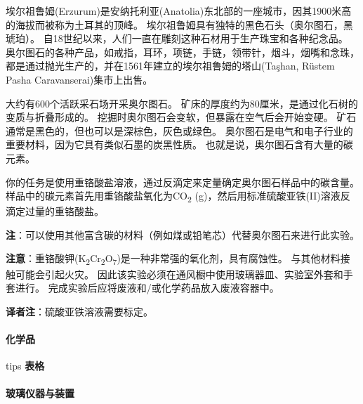 埃尔祖鲁姆(Erzurum)是安纳托利亚(Anatolia)东北部的一座城市，因其1900米高的海拔而被称为土耳其的顶峰。
埃尔祖鲁姆具有独特的黑色石头（奥尔图石，黑琥珀）。
自18世纪以来，人们一直在雕刻这种石材用于生产珠宝和各种纪念品。
奥尔图石的各种产品，如戒指，耳环，项链，手链，领带针，烟斗，烟嘴和念珠，都是通过抛光生产的，并在1561年建立的埃尔祖鲁姆的塔山(Taşhan,
Rüstem Pasha Caravanserai)集市上出售。

大约有600个活跃采石场开采奥尔图石。
矿床的厚度约为80厘米，是通过化石树的变质与折叠形成的。
挖掘时奥尔图石会变软，但暴露在空气后会开始变硬。
矿石通常是黑色的，但也可以是深棕色，灰色或绿色。
奥尔图石是电气和电子行业的重要材料，因为它具有类似石墨的炭黑性质。
也就是说，奥尔图石含有大量的碳元素。

你的任务是使用重铬酸盐溶液，通过反滴定来定量确定奥尔图石样品中的碳含量。
样品中的碳元素首先用重铬酸盐氧化为CO\textsubscript{2}
(g)，然后用标准硫酸亚铁(II)溶液反滴定过量的重铬酸盐。

\textbf{注}：可以使用其他富含碳的材料（例如煤或铅笔芯）代替奥尔图石来进行此实验。

\textbf{注意}：重铬酸钾(K\textsubscript{2}Cr\textsubscript{2}O\textsubscript{7})是一种非常强的氧化剂，具有腐蚀性。
与其他材料接触可能会引起火灾。
因此该实验必须在通风橱中使用玻璃器皿、实验室外套和手套进行。
完成实验后应将废液和/或化学药品放入废液容器中。

\textbf{译者注}：硫酸亚铁溶液需要标定。

\paragraph{化学品}

tips \textbf{表格}

\paragraph{玻璃仪器与装置}

